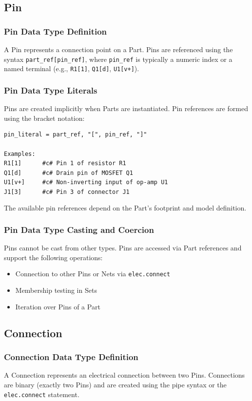 \subsection{Pin}
\subsubsection{Pin Data Type Definition}
A Pin represents a connection point on a Part. Pins are referenced using the syntax \texttt{part\_ref[pin\_ref]}, where \texttt{pin\_ref} is typically a numeric index or a named terminal (e.g., \texttt{R1[1]}, \texttt{Q1[d]}, \texttt{U1[v+]}).
\subsubsection{Pin Data Type Literals}
Pins are created implicitly when Parts are instantiated. Pin references are formed using the bracket notation:
\begin{verbatim}
pin_literal = part_ref, "[", pin_ref, "]"

Examples:
R1[1]      #c# Pin 1 of resistor R1
Q1[d]      #c# Drain pin of MOSFET Q1
U1[v+]     #c# Non-inverting input of op-amp U1
J1[3]      #c# Pin 3 of connector J1
\end{verbatim}
The available pin references depend on the Part's footprint and model definition.
\subsubsection{Pin Data Type Casting and Coercion}
Pins cannot be cast from other types. Pins are accessed via Part references and support the following operations:
\begin{itemize}
\item Connection to other Pins or Nets via \texttt{elec.connect}
\item Membership testing in Sets
\item Iteration over Pins of a Part
\end{itemize}
\subsection{Connection}
\subsubsection{Connection Data Type Definition}
A Connection represents an electrical connection between two Pins. Connections are binary (exactly two Pins) and are created using the pipe syntax or the \texttt{elec.connect} statement.
